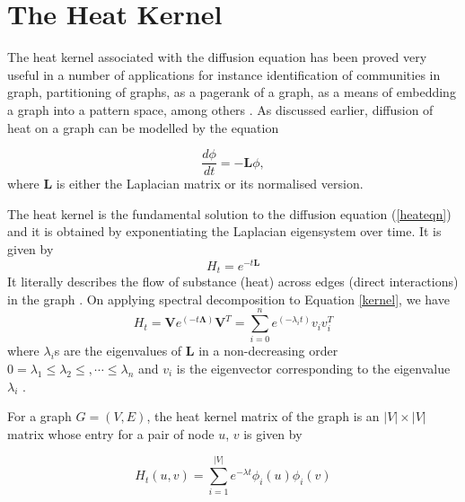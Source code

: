 \documentclass[10pt,a4paper]{article}
\begin{document}
        
        \newpage
        \section{The Heat Kernel}
        The heat kernel associated with the diffusion equation has been proved very useful in a number of applications for instance identification of communities in graph,  partitioning of graphs, as a pagerank of a graph, as a means of embedding a graph into a pattern space, among others \citep{chung2007heat,chung2009local,kloster2014heat}. 
        As discussed earlier, diffusion of heat on a graph can be modelled by the equation 
        
        \begin{equation}
        \frac{d \phi}{dt} = -\mathbf{L} \phi,
        \label{heateqn}
        \end{equation}
        where $\mathbf{L}$ is either the Laplacian matrix or its normalised version. 
        
        The heat kernel is the fundamental solution to the diffusion equation (\ref{heateqn}) and it is obtained by exponentiating the Laplacian eigensystem over time. It is given by
        \begin{equation}
        H_t = e^{-t \mathbf{L}} 
        \label{kernel}
        \end{equation}
        It literally describes the flow of substance (heat) across edges (direct interactions) in the graph \citep{xiao2009graph}.
        On applying spectral decomposition to Equation \ref{kernel}, we have 
        \begin{equation}
        H_t = \mathbf{V} e^{(-t \mathbf{\Lambda})} \mathbf{V}^T =  \sum_{i=0}^n e^{(-\lambda_i t)} v_i v_i^T 
        \label{decomp}
        \end{equation}
        where $\lambda_i$s are the eigenvalues of $\mathbf{L}$ in a non-decreasing order $0=\lambda_1 \leq  \lambda_2 \leq, \cdots \leq \lambda_n$ and $v_i$ is the eigenvector corresponding to the eigenvalue $\lambda_i$ \citep{anton2007elementary}.
        
        For a graph $G=(V,E)$, the heat kernel matrix of the graph is an $|V| \times |V|$ matrix whose entry for a pair of node $u$, $v$ is given by 
        
        \begin{equation}
        H_t(u,v) = \sum_{i=1}^{|V|} e^{-\lambda t} \phi_i(u) \phi_i(v)
        \end{equation} 
       
\end{document}
